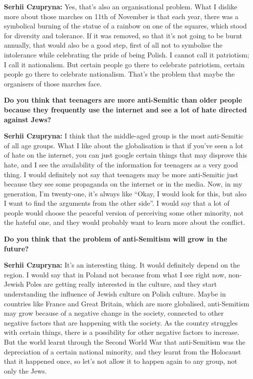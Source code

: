 \textbf{Serhii Czupryna:} Yes, that’s also an organisational problem. What I dislike more about those marches on 11th of November is that each year, there was a symbolical burning of the statue of a rainbow on one of the squares, which stood for diversity and tolerance. If it was removed, so that it’s not going to be burnt annually, that would also be a good step, first of all not to symbolise the intolerance while celebrating the pride of being Polish. I cannot call it patriotism; I call it nationalism. But certain people go there to celebrate patriotism, certain people go there to celebrate nationalism. That’s the problem that maybe the organisers of those marches face.\par
\textbf{Do you think that teenagers are more anti-Semitic than older people because they frequently use the internet and see a lot of hate directed against Jews? }\par
\textbf{Serhii Czupryna:} I think that the middle-aged group is the most anti-Semitic of all age groups. What I like about the globalisation is that if you’ve seen a lot of hate on the internet, you can just google certain things that may disprove this hate, and I see the availability of the information for teenagers as a very good thing. I would definitely not say that teenagers may be more anti-Semitic just because they see some propaganda on the internet or in the media. Now, in my generation, I’m twenty-one, it’s always like ``Okay, I would look for this, but also I want to find the arguments from the other side''. I would say that a lot of people would choose the peaceful version of perceiving some other minority, not the hateful one, and they would probably want to learn more about the conflict.\par
\textbf{Do you think that the problem of anti-Semitism will grow in the future?}\par
\textbf{Serhii Czupryna:} It’s an interesting thing. It would definitely depend on the region. I would say that in Poland not because from what I see right now, non-Jewish Poles are getting really interested in the culture, and they start understanding the influence of Jewish culture on Polish culture. Maybe in countries like France and Great Britain, which are more globalised, anti-Semitism may grow because of a negative change in the society, connected to other negative factors that are happening with the society. As the country struggles with certain things, there is a possibility for other negative factors to increase. But the world learnt through the Second World War that anti-Semitism was the depreciation of a certain national minority, and they learnt from the Holocaust that it happened once, so let’s not allow it to happen again to any group, not only the Jews.\par
